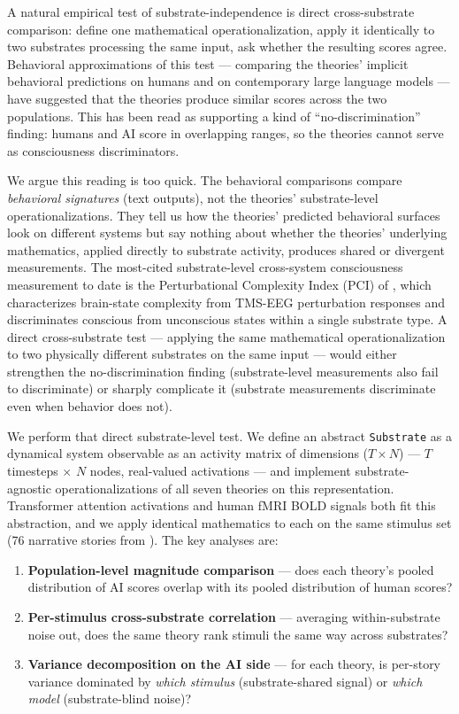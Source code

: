 \documentclass[11pt,a4paper]{article}
\begin{document}
A natural empirical test of substrate-independence is direct cross-substrate comparison: define one mathematical operationalization, apply it identically to two substrates processing the same input, ask whether the resulting scores agree. Behavioral approximations of this test --- comparing the theories' implicit behavioral predictions on humans and on contemporary large language models --- have suggested that the theories produce similar scores across the two populations. This has been read as supporting a kind of ``no-discrimination'' finding: humans and AI score in overlapping ranges, so the theories cannot serve as consciousness discriminators.

We argue this reading is too quick. The behavioral comparisons compare \emph{behavioral signatures} (text outputs), not the theories' substrate-level operationalizations. They tell us how the theories' predicted behavioral surfaces look on different systems but say nothing about whether the theories' underlying mathematics, applied directly to substrate activity, produces shared or divergent measurements. The most-cited substrate-level cross-system consciousness measurement to date is the Perturbational Complexity Index (PCI) of \citet{casali2013theoretically}, which characterizes brain-state complexity from TMS-EEG perturbation responses and discriminates conscious from unconscious states within a single substrate type. A direct cross-substrate test --- applying the same mathematical operationalization to two physically different substrates on the same input --- would either strengthen the no-discrimination finding (substrate-level measurements also fail to discriminate) or sharply complicate it (substrate measurements discriminate even when behavior does not).

We perform that direct substrate-level test. We define an abstract \texttt{Substrate} as a dynamical system observable as an activity matrix of dimensions ($T \times N$) --- $T$ timesteps $\times$ $N$ nodes, real-valued activations --- and implement substrate-agnostic operationalizations of all seven theories on this representation. Transformer attention activations and human fMRI BOLD signals both fit this abstraction, and we apply identical mathematics to each on the same stimulus set (76 narrative stories from \citealt{lebel2023natural}). The key analyses are:

\begin{enumerate}
  \item \textbf{Population-level magnitude comparison} --- does each theory's pooled distribution of AI scores overlap with its pooled distribution of human scores?
  \item \textbf{Per-stimulus cross-substrate correlation} --- averaging within-substrate noise out, does the same theory rank stimuli the same way across substrates?
  \item \textbf{Variance decomposition on the AI side} --- for each theory, is per-story variance dominated by \emph{which stimulus} (substrate-shared signal) or \emph{which model} (substrate-blind noise)?
\end{enumerate}
\end{document}
